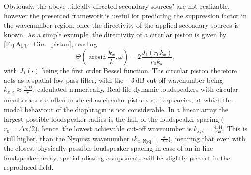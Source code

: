 \vspace{3mm}
Obviously, the above ,,ideally directed secondary sources" are not realizable, however the presented framework is useful for predicting the suppression
factor in the wavenumber region, once the directivity of the applied secondary sources is known.
As a simple example, the directivity of a circular piston is given by \eqref{Eq:App_Circ_piston}, reading
\begin{equation}
\Theta(\arcsin \frac{k_x}{k},\omega) = 2\frac{J_1\left( r_0 k_x\right)}{r_0 k_x},
\end{equation}
with $J_1(\cdot)$ being the first order Bessel function.
The circular piston therefore acts as a spatial low-pass filter, with the $-3~\mathrm{dB}$ cut-off wavenumber being $k_{x,c} \approx \frac{2.22}{r_0}$, calculated numerically.
Real-life dynamic loudspeakers with circular membranes are often modeled as circular pistons at frequencies, at which the modal behaviour of the diaphragm is not considerable.
In a linear array the largest possible loudspeaker radius is the half of the loudspeaker spacing ($r_0 = \Delta x/2$), hence, the lowest achievable cut-off wavenumber is 
$k_{x,c} = \frac{4.44}{\Delta x}$.
This is still higher, than the Nyquist wavenumber ($k_{x,\mathrm{Nyq}} = \frac{\pi}{\Delta x}$), meaning that even with the closest physically possible loudspeaker spacing in case of an in-line loudspeaker array, spatial aliasing components will be slightly present in the reproduced field.
